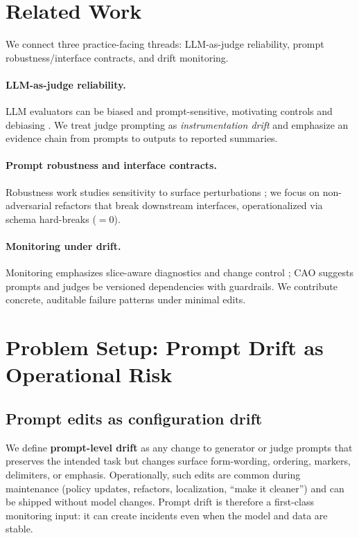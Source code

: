 \documentclass{article}
\begin{document}
\section{Related Work}
We connect three practice-facing threads: LLM-as-judge reliability, prompt robustness/interface contracts, and drift monitoring.

\paragraph{LLM-as-judge reliability.} LLM evaluators can be biased and prompt-sensitive, motivating controls and debiasing \citep{zheng2023judging,chiang2024chatbotarena,dubois2024lengthcontrolled,chen2024humans,mukherjee2025metaevalcollapse,feuer2025judgmentnoise}. We treat judge prompting as \emph{instrumentation drift} and emphasize an evidence chain from prompts to outputs to reported summaries.
\paragraph{Prompt robustness and interface contracts.} Robustness work studies sensitivity to surface perturbations \citep{zhu2023promptrobust}; we focus on non-adversarial refactors that break downstream interfaces, operationalized via schema hard-breaks (\Astruct$=0$).
\paragraph{Monitoring under drift.} Monitoring emphasizes slice-aware diagnostics and change control \citep{kang2020modelassertions,yao2022wildtime,baby2025adapting,hao2025nazar}; CAO suggests prompts and judges be versioned dependencies with guardrails. We contribute concrete, auditable failure patterns under minimal edits.

\section{Problem Setup: Prompt Drift as Operational Risk}
\subsection{Prompt edits as configuration drift}
We define \textbf{prompt-level drift} as any change to generator or judge prompts that preserves the intended task but changes surface form-wording, ordering, markers, delimiters, or emphasis.
Operationally, such edits are common during maintenance (policy updates, refactors, localization, ``make it cleaner'') and can be shipped without model changes.
Prompt drift is therefore a first-class monitoring input: it can create incidents even when the model and data are stable.
\end{document}
